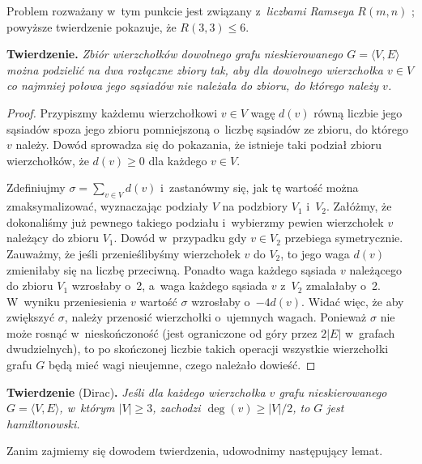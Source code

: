 Problem rozważany w~tym punkcie jest związany z~\emph{liczbami Ramseya} $R(m,n)$ \cite{ramseynumber}; powyższe twierdzenie pokazuje, że $R(3,3)\le6$.

\subproblem %
\textsf{\textbf{Twierdzenie.}} \textit{Zbiór wierzchołków dowolnego grafu nieskierowanego\/ $G=\langle V,E\rangle$ można podzielić na dwa rozłączne zbiory tak, aby dla dowolnego wierzchołka\/ $v\in V$ co najmniej połowa jego sąsiadów nie należała do zbioru, do którego należy\/ $v$.}
\begin{proof}
Przypiszmy każdemu wierzchołkowi $v\in V$ wagę $d(v)$ równą liczbie jego sąsiadów spoza jego zbioru pomniejszoną o~liczbę sąsiadów ze zbioru, do którego $v$ należy. Dowód sprowadza się do pokazania, że istnieje taki podział zbioru wierzchołków, że $d(v)\ge0$ dla każdego $v\in V$\!.

Zdefiniujmy $\sigma=\sum_{v\in V}d(v)$ i~zastanówmy się, jak tę wartość można zmaksymalizować, wyznaczając podziały $V$ na podzbiory $V_1$ i~$V_2$. Załóżmy, że dokonaliśmy już pewnego takiego podziału i~wybierzmy pewien wierzchołek $v$ należący do zbioru $V_1$. Dowód w~przypadku gdy $v\in V_2$ przebiega symetrycznie. Zauważmy, że jeśli przenieślibyśmy wierzchołek $v$ do $V_2$, to jego waga $d(v)$ zmieniłaby się na liczbę przeciwną. Ponadto waga każdego sąsiada $v$ należącego do zbioru $V_1$ wzrosłaby o~2, a~waga każdego sąsiada $v$ z~$V_2$ zmalałaby o~2. W~wyniku przeniesienia $v$ wartość $\sigma$ wzrosłaby o~$-4d(v)$. Widać więc, że aby zwiększyć $\sigma$, należy przenosić wierzchołki o~ujemnych wagach. Ponieważ $\sigma$ nie może rosnąć w~nieskończoność (jest ograniczone od góry przez $2|E|$ w~grafach dwudzielnych), to po skończonej liczbie takich operacji wszystkie wierzchołki grafu $G$ będą mieć wagi nieujemne, czego należało dowieść.
\end{proof}

\subproblem %
\textsf{\textbf{Twierdzenie} (Dirac)\textbf{.}} \textit{Jeśli dla każdego wierzchołka\/ $v$ grafu nieskierowanego\/ $G=\langle V,E\rangle$, w~którym\/ $|V|\ge3$, zachodzi\/ $\deg(v)\ge|V|/2$, to\/ $G$ jest hamiltonowski.}

\medskip
\noindent Zanim zajmiemy się dowodem twierdzenia, udowodnimy następujący lemat.

